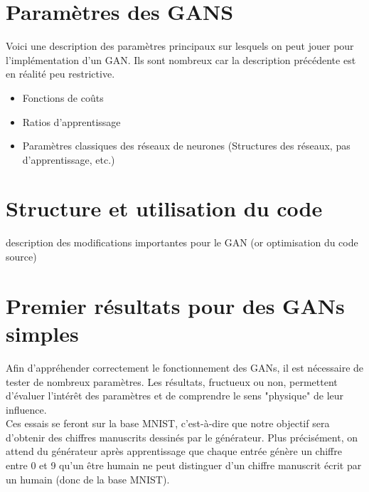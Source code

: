 \section{Paramètres des GANS}

	Voici une description des paramètres principaux sur lesquels on peut jouer pour l'implémentation d'un GAN. Ils sont nombreux car la description précédente est en réalité peu restrictive.

	\begin{itemize}
	 	\item Fonctions de coûts
	 	\item Ratios d'apprentissage
	 	\item Paramètres classiques des réseaux de neurones (Structures des réseaux, pas d'apprentissage, etc.)
	\end{itemize}


\section{Structure et utilisation du code}
	{description des modifications importantes pour le GAN (or optimisation du code source)}


\section{Premier résultats pour des GANs simples}
	Afin d'appréhender correctement le fonctionnement des GANs, il est nécessaire de tester de nombreux paramètres. Les résultats, fructueux ou non, permettent d'évaluer l'intérêt des paramètres et de comprendre le sens "physique" de leur influence.\\
	Ces essais se feront sur la base MNIST, c'est-à-dire que notre objectif sera d'obtenir des chiffres manuscrits dessinés par le générateur. Plus précisément, on attend du générateur après apprentissage que chaque entrée génère un chiffre entre 0 et 9 qu'un être humain ne peut distinguer d'un chiffre manuscrit écrit par un humain (donc de la base MNIST).

